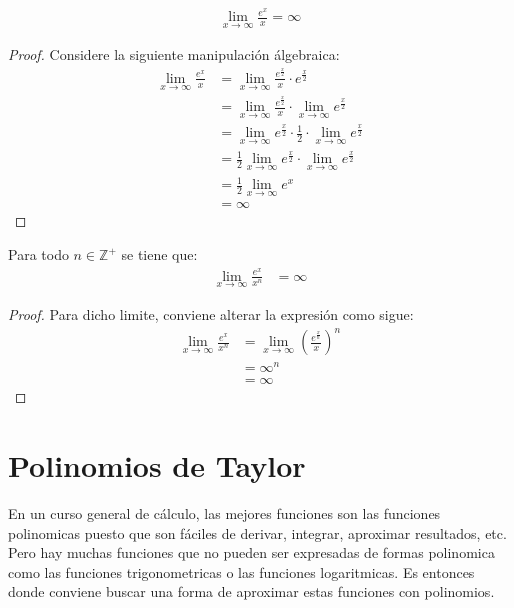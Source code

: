 \documentclass[12pt,a4paper,oneside]{memoir}
\begin{document}
\begin{lemma}
    \begin{align*}
        \lim_{x \to \infty} \frac{e^x}{x} = \infty
    \end{align*}
\end{lemma}
\begin{proof}
    Considere la siguiente manipulación álgebraica:
    \begin{align*}
        \lim_{x \to \infty} \frac{e^x}{x} &= \lim_{x \to \infty} \frac{e^{\frac{x}{2}}}{x} \cdot e^{\frac{x}{2}}\\
        &= \lim_{x \to \infty} \frac{e^{\frac{x}{2}}}{x} \cdot \lim_{x \to \infty} e^{\frac{x}{2}}\\
        &= \lim_{x \to \infty} e^{\frac{x}{2}} \cdot \frac{1}{2} \cdot \lim_{x \to \infty} e^{\frac{x}{2}}\\
        &= \frac{1}{2} \lim_{x \to \infty} e^{\frac{x}{2}} \cdot \lim_{x \to \infty} e^{\frac{x}{2}}\\
        &= \frac{1}{2} \lim_{x \to \infty} e^x\\
        &= \infty
    \end{align*}
\end{proof}

\begin{theorem}
    Para todo $n \in \mathbb{Z}^+$ se tiene que:
    \begin{align*}
        \lim_{x \to \infty} \frac{e^x}{x^n} &= \infty
    \end{align*}
\end{theorem}
\begin{proof}
    Para dicho limite, conviene alterar la expresión como sigue:
    \begin{align*}
        \lim_{x \to \infty} \frac{e^x}{x^n} &= \lim_{x \to \infty} \left(\frac{e^{\frac{x}{n}}}{x}\right)^n\\
        &= \infty^n\\
        &= \infty
    \end{align*}
\end{proof}

\section*{Polinomios de Taylor}
En un curso general de cálculo, las mejores funciones son las funciones polinomicas puesto que son fáciles de derivar, integrar, aproximar resultados, etc. Pero hay muchas funciones que no pueden ser expresadas de formas polinomica como las funciones trigonometricas o las funciones logaritmicas. Es entonces donde conviene buscar una forma de aproximar estas funciones con polinomios.\\
\end{document}
